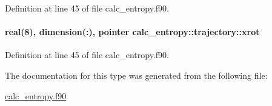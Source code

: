 Definition at line 45 of file calc\-\_\-entropy.\-f90.

\hypertarget{structcalc__entropy_1_1trajectory_af194da745b1b19e925c45d444c923d4f}{
\paragraph[{xrot}]{\setlength{\rightskip}{0pt plus 5cm}real(8), dimension(\-:), pointer calc\-\_\-entropy\-::trajectory\-::xrot}}\label{structcalc__entropy_1_1trajectory_af194da745b1b19e925c45d444c923d4f}


Definition at line 45 of file calc\-\_\-entropy.\-f90.



The documentation for this type was generated from the following file\-:\begin{DoxyCompactItemize}
\item 
\hyperlink{calc__entropy_8f90}{calc\-\_\-entropy.\-f90}\end{DoxyCompactItemize}
